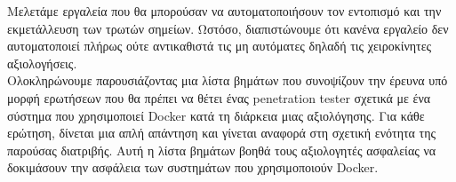 Μελετάμε εργαλεία που θα μπορούσαν να αυτοματοποιήσουν τον εντοπισμό
και την εκμετάλλευση των τρωτών σημείων. Ωστόσο, διαπιστώνουμε
ότι κανένα εργαλείο δεν αυτοματοποιεί πλήρως ούτε αντικαθιστά τις μη
αυτόματες δηλαδή τις χειροκίνητες αξιολογήσεις.\mbox{} \\

Ολοκληρώνουμε παρουσιάζοντας μια λίστα βημάτων που συνοψίζουν την έρευνα
υπό μορφή ερωτήσεων που θα πρέπει να θέτει ένας \textlatin{penetration tester}
σχετικά με ένα σύστημα που χρησιμοποιεί \textlatin{Docker} κατά τη διάρκεια
μιας αξιολόγησης. Για κάθε ερώτηση, δίνεται μια απλή απάντηση  και γίνεται
αναφορά στη σχετική ενότητα της παρούσας διατριβής.
Αυτή η λίστα βημάτων βοηθά τους αξιολογητές ασφαλείας  να δοκιμάσουν την
ασφάλεια των συστημάτων που χρησιμοποιούν \textlatin{Docker}.
